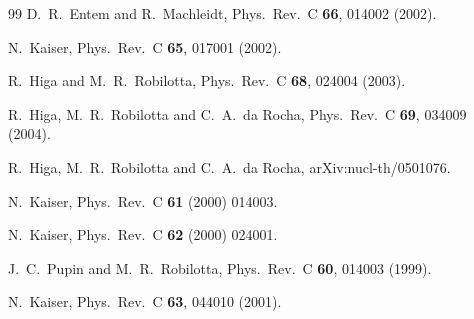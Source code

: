 \documentclass[aps,rmp,nofootinbib,twocolumn,floatfix]{revtex4}
\begin{document}
\begin{thebibliography}{99}
  D.~R.~Entem and R.~Machleidt,
  Phys.\ Rev.\  C {\bf 66}, 014002 (2002).

  N.~Kaiser,
  Phys.\ Rev.\  C {\bf 65}, 017001 (2002).

  R.~Higa and M.~R.~Robilotta,
  Phys.\ Rev.\  C {\bf 68}, 024004 (2003).

  R.~Higa, M.~R.~Robilotta and C.~A.~da Rocha,
  Phys.\ Rev.\  C {\bf 69}, 034009 (2004).

  R.~Higa, M.~R.~Robilotta and C.~A.~da Rocha,
  arXiv:nucl-th/0501076.

  N.~Kaiser,
  Phys.\ Rev.\  C {\bf 61} (2000) 014003.

  N.~Kaiser,
  Phys.\ Rev.\  C {\bf 62} (2000) 024001.

  J.~C.~Pupin and M.~R.~Robilotta,
  Phys.\ Rev.\  C {\bf 60}, 014003 (1999).

  N.~Kaiser,
  Phys.\ Rev.\  C {\bf 63}, 044010 (2001).


\end{thebibliography}
\end{document}
